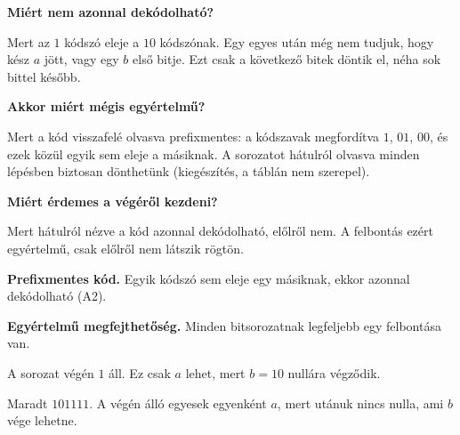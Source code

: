 \begin{elmelet}
\textbf{Miért nem azonnal dekódolható?}\par Mert az $1$ kódszó eleje a $10$ kódszónak. Egy egyes után még nem tudjuk, hogy kész $a$ jött, vagy egy $b$ első bitje. Ezt csak a következő bitek döntik el, néha sok bittel később.

\textbf{Akkor miért mégis egyértelmű?}\par Mert a kód visszafelé olvasva prefixmentes: a kódszavak megfordítva $1$, $01$, $00$, és ezek közül egyik sem eleje a másiknak. A sorozatot hátulról olvasva minden lépésben biztosan dönthetünk (kiegészítés, a táblán nem szerepel).

\textbf{Miért érdemes a végéről kezdeni?}\par Mert hátulról nézve a kód azonnal dekódolható, előlről nem. A felbontás ezért egyértelmű, csak előlről nem látszik rögtön.
\end{elmelet}
\begin{elmelet}
\textbf{Prefixmentes kód.} Egyik kódszó sem eleje egy másiknak, ekkor azonnal dekódolható (A2).

\textbf{Egyértelmű megfejthetőség.} Minden bitsorozatnak legfeljebb egy felbontása van.
\end{elmelet}

A sorozat végén $1$ áll. Ez csak $a$ lehet, mert $b=10$ nullára végződik.

\begin{center}\end{center}

\begin{center}\end{center}

Maradt $101111$. A végén álló egyesek egyenként $a$, mert utánuk nincs nulla, ami $b$ vége lehetne.

\begin{center}\end{center}

\begin{center}\end{center}

